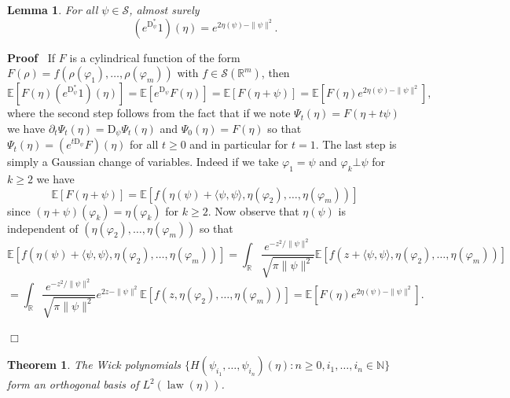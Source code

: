 \documentclass[a4paper,11pt]{article}
\newcommand{\mathD}{\mathrm{D}}
\newcommand{\tmop}[1]{\ensuremath{\operatorname{#1}}}
\newenvironment{proof}{\noindent\textbf{Proof\ }}{\hspace*{\fill}$\Box$\medskip}
\newtheorem{lemma}{Lemma}
{\theorembodyfont{\rmfamily}\newtheorem{remark}{Remark}}
\newtheorem{theorem}{Theorem}
\newcommand{\CS}{\mathscr{S}}
\begin{document}
\begin{lemma}
  \label{lem:exp-D-star}For all $\psi \in \CS$, almost surely
  \[ (e^{\mathD^{\ast}_{\psi}} 1) (\eta) = e^{2 \eta (\psi) - \| \psi \|^2} .
  \]
\end{lemma}

\begin{proof}
  If $F$ is a cylindrical function of the form $F (\rho) = f (\rho
  (\varphi_1), \ldots, \rho (\varphi_m))$ with $f \in \CS (\mathbb{R}^m)$,
  then
  \[ \mathbb{E} [F (\eta) (e^{\mathD^{\ast}_{\psi}} 1) (\eta)] =\mathbb{E}
     [e^{\mathD_{\psi}} F (\eta)] =\mathbb{E} [F (\eta + \psi)] =\mathbb{E}
     [F (\eta) e^{2 \eta (\psi) - \| \psi \|^2}], \]
  where the second step follows from the fact that if we note $\Psi_t (\eta) =
  F (\eta + t \psi)$ we have $\partial_t \Psi_t (\eta) = \mathD_{\psi} \Psi_t
  (\eta)$ and $\Psi_0 (\eta) = F (\eta)$ so that $\Psi_t (\eta) = (e^{t
  \mathD_{\psi}} F) (\eta)$ for all $t \geqslant 0$ and in particular for $t =
  1$. The last step is simply a Gaussian change of variables. Indeed if we
  take $\varphi_1 = \psi$ and $\varphi_k \bot \psi$ for $k \geqslant 2$ we
  have
  \[ \mathbb{E} [F (\eta + \psi)] =\mathbb{E} [f (\eta (\psi) + \langle
     \psi, \psi \rangle, \eta (\varphi_2), \ldots, \eta (\varphi_m))] \]
  since $(\eta + \psi) (\varphi_k) = \eta (\varphi_k)$ for $k \geqslant 2$.
  Now observe that $\eta (\psi)$ is independent of $(\eta (\varphi_2), \ldots,
  \eta (\varphi_m))$ so that
  \[ \mathbb{E} [f (\eta (\psi) + \langle \psi, \psi \rangle, \eta
     (\varphi_2), \ldots, \eta (\varphi_m))] = \int_{\mathbb{R}} \frac{e^{-
     z^2 / \| \psi \|^2}}{\sqrt{\pi \| \psi \|^2}} \mathbb{E} [f (z + \langle
     \psi, \psi \rangle, \eta (\varphi_2), \ldots, \eta (\varphi_m))] \]
  \[ = \int_{\mathbb{R}} \frac{e^{- z^2 / \| \psi \|^2}}{\sqrt{\pi \| \psi
     \|^2}} e^{2 z - \| \psi \|^2} \mathbb{E} [f (z, \eta (\varphi_2),
     \ldots, \eta (\varphi_m))] =\mathbb{E} [F (\eta) e^{2 \eta (\psi) - \|
     \psi \|^2}] . \]
  
\end{proof}

\begin{theorem}
  The Wick polynomials $\{ H (\psi_{i_1}, \ldots, \psi_{i_n}) (\eta) : n
  \geqslant 0, i_1, \ldots, i_n \in \mathbb{N} \}$ form an orthogonal basis
  of $L^2 (\tmop{law} (\eta))$.
\end{theorem}
\end{document}
